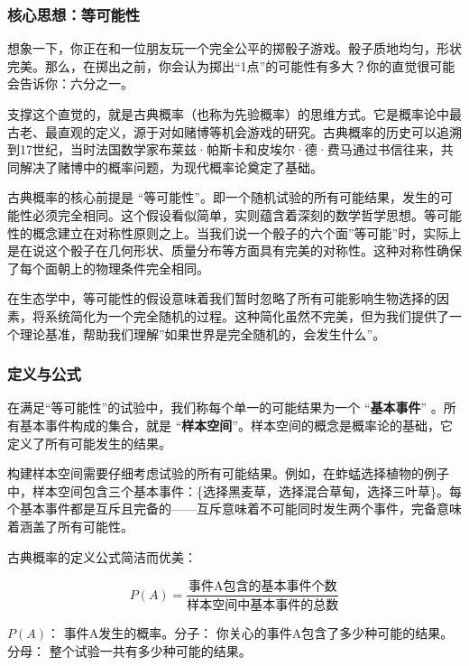 \documentclass[
]{book}
\begin{document}
\hypertarget{ux6838ux5fc3ux601dux60f3ux7b49ux53efux80fdux6027}{%
\subsubsection{核心思想：等可能性}\label{ux6838ux5fc3ux601dux60f3ux7b49ux53efux80fdux6027}}

想象一下，你正在和一位朋友玩一个完全公平的掷骰子游戏。骰子质地均匀，形状完美。那么，在掷出之前，你会认为掷出``1点''的可能性有多大？你的直觉很可能会告诉你：六分之一。

支撑这个直觉的，就是古典概率（也称为先验概率）的思维方式。它是概率论中最古老、最直观的定义，源于对如赌博等机会游戏的研究。古典概率的历史可以追溯到17世纪，当时法国数学家布莱兹·帕斯卡和皮埃尔·德·费马通过书信往来，共同解决了赌博中的概率问题，为现代概率论奠定了基础。

古典概率的核心前提是 ``等可能性''。即一个随机试验的所有可能结果，发生的可能性必须完全相同。这个假设看似简单，实则蕴含着深刻的数学哲学思想。等可能性的概念建立在对称性原则之上。当我们说一个骰子的六个面''等可能''时，实际上是在说这个骰子在几何形状、质量分布等方面具有完美的对称性。这种对称性确保了每个面朝上的物理条件完全相同。

在生态学中，等可能性的假设意味着我们暂时忽略了所有可能影响生物选择的因素，将系统简化为一个完全随机的过程。这种简化虽然不完美，但为我们提供了一个理论基准，帮助我们理解''如果世界是完全随机的，会发生什么''。

\hypertarget{ux5b9aux4e49ux4e0eux516cux5f0f}{%
\subsubsection{定义与公式}\label{ux5b9aux4e49ux4e0eux516cux5f0f}}

在满足``等可能性''的试验中，我们称每个单一的可能结果为一个 ``\textbf{基本事件}'' 。所有基本事件构成的集合，就是 ``\textbf{样本空间}''。样本空间的概念是概率论的基础，它定义了所有可能发生的结果。

构建样本空间需要仔细考虑试验的所有可能结果。例如，在蚱蜢选择植物的例子中，样本空间包含三个基本事件：\{选择黑麦草，选择混合草甸，选择三叶草\}。每个基本事件都是互斥且完备的------互斥意味着不可能同时发生两个事件，完备意味着涵盖了所有可能性。

古典概率的定义公式简洁而优美：

\[P(A) = \frac{\text{事件A包含的基本事件个数}}{\text{样本空间中基本事件的总数}}\]

\(P(A)\)： 事件A发生的概率。分子： 你关心的事件A包含了多少种可能的结果。分母： 整个试验一共有多少种可能的结果。
\end{document}
